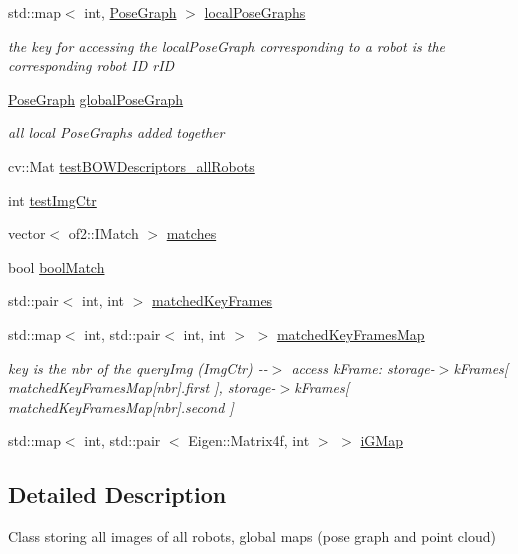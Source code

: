 \begin{DoxyCompactItemize}
\item 
std\-::map$<$ int, \hyperlink{classPoseGraph}{\-Pose\-Graph} $>$ \hyperlink{classCentralStorage_a872f54468c1ac5aa5438d3c820cfc5bd}{local\-Pose\-Graphs}
\begin{DoxyCompactList}\small\item\em the key for accessing the local\-Pose\-Graph corresponding to a robot is the corresponding robot \-I\-D r\-I\-D \end{DoxyCompactList}\item 
\hyperlink{classPoseGraph}{\-Pose\-Graph} \hyperlink{classCentralStorage_a710a94a5fbcb985594717f0864405872}{global\-Pose\-Graph}
\begin{DoxyCompactList}\small\item\em all local \-Pose\-Graphs added together \end{DoxyCompactList}\item 
cv\-::\-Mat \hyperlink{classCentralStorage_ab3aae9d93bbccd2a646330cb8812824f}{test\-B\-O\-W\-Descriptors\-\_\-all\-Robots}
\item 
int \hyperlink{classCentralStorage_ac6ecd35e9f6a9d0145f87fb98c6fb923}{test\-Img\-Ctr}
\item 
vector$<$ of2\-::\-I\-Match $>$ \hyperlink{classCentralStorage_af2ce7451320774bb90db744fa46493bd}{matches}
\item 
bool \hyperlink{classCentralStorage_a311e52441ce3ca79a2eac623c58221cc}{bool\-Match}
\item 
std\-::pair$<$ int, int $>$ \hyperlink{classCentralStorage_a393e5d052d921122176d0ebf0a6cfadb}{matched\-Key\-Frames}
\item 
std\-::map$<$ int, std\-::pair$<$ int, \*
int $>$ $>$ \hyperlink{classCentralStorage_a8382babfd80ae718d4f15ddfa5ef5017}{matched\-Key\-Frames\-Map}
\begin{DoxyCompactList}\small\item\em key is the nbr of the query\-Img (\-Img\-Ctr) -\/-\/$>$ access k\-Frame\-: storage-\/$>$k\-Frames\mbox{[} matched\-Key\-Frames\-Map\mbox{[}nbr\mbox{]}.first \mbox{]}, storage-\/$>$k\-Frames\mbox{[} matched\-Key\-Frames\-Map\mbox{[}nbr\mbox{]}.second \mbox{]} \end{DoxyCompactList}\item 
std\-::map$<$ int, std\-::pair\*
$<$ \-Eigen\-::\-Matrix4f, int $>$ $>$ \hyperlink{classCentralStorage_a3ae59bfa3849b3dd984c636e0a9af23a}{i\-G\-Map}
\end{DoxyCompactItemize}


\subsection{\-Detailed \-Description}
\-Class storing all images of all robots, global maps (pose graph and point cloud) 

